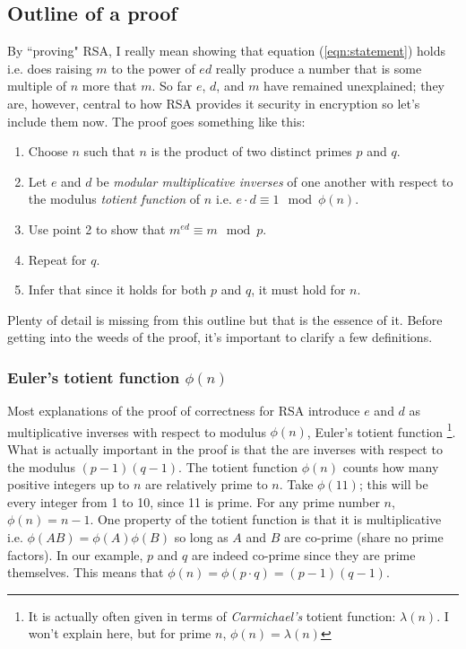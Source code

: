 \documentclass[]{scrartcl}
\theoremstyle{definition}
\let\oldref\ref
\renewcommand{\ref}[1]{(\oldref{#1})}
\begin{document}
\subsection{Outline of a proof}
By ``proving" RSA, I really mean showing that equation \ref{eqn:statement} holds i.e. does raising $m$ to the power of $ed$ really produce a number that is some multiple of $n$ more that $m$. So far $e$, $d$, and $m$ have remained unexplained; they are, however, central to how RSA provides it security in encryption so let's include them now. The proof goes something like this:
\begin{enumerate}
    \item Choose $n$ such that $n$ is the product of two distinct primes $p$ and $q$.
    \item Let $e$ and $d$ be \textit{modular multiplicative inverses} of one another with respect to the modulus \textit{totient function} of $n$ i.e. $e\cdot d \equiv 1 \mod \phi(n)$.
    \item Use point 2 to show that $m^{ed} \equiv m \mod p$.
    \item Repeat for $q$.
    \item Infer that since it holds for both $p$ and $q$, it must hold for $n$.
\end{enumerate}
Plenty of detail is missing from this outline but that is the essence of it. Before getting into the weeds of the proof, it's important to clarify a few definitions.
\subsubsection{Euler's totient function $\phi(n)$}
Most explanations of the proof of correctness for RSA introduce $e$ and $d$ as multiplicative inverses with respect to modulus $\phi(n)$, Euler's totient function \footnote{It is actually often given in terms of \textit{Carmichael's} totient function: $\lambda(n)$. I won't explain here, but for prime $n$, $\phi(n) = \lambda(n)$}. What is actually important in the proof is that the are inverses with respect to the modulus $(p-1)(q-1)$. The totient function $\phi(n)$ counts how many positive integers up to $n$ are relatively prime to $n$. Take $\phi(11)$; this will be every integer from 1 to 10, since 11 is prime. For any prime number $n$, $\phi(n) = n-1$. One property of the totient function is that it is multiplicative i.e. $\phi(AB) = \phi(A)\phi(B)$ so long as $A$ and $B$ are co-prime (share no prime factors). In our example, $p$ and $q$ are indeed co-prime since they are prime themselves. This means that $\phi(n)=\phi(p\cdot q)=(p-1)(q-1)$.
\end{document}
